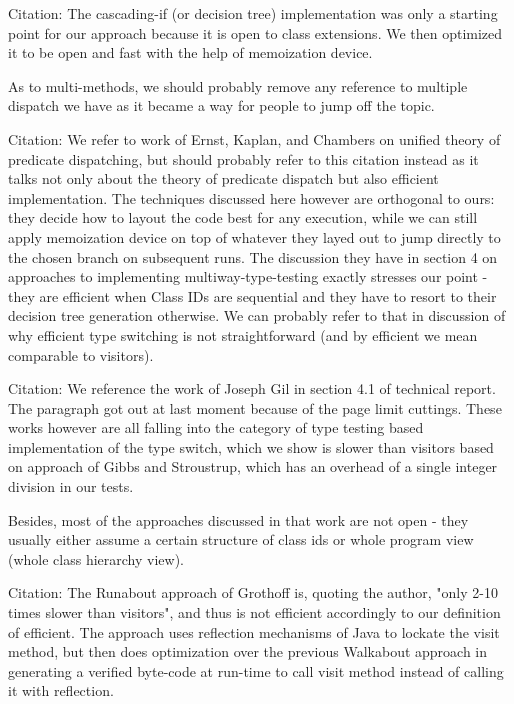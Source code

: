 Citation\cite{Clifton:2000:MMO:353171.353181}:
The cascading-if (or decision tree) implementation was only a starting point for 
our approach because it is open to class extensions. We then optimized it to be 
open and fast with the help of memoization device.  

As to multi-methods, we should probably remove any reference to multiple 
dispatch we have as it became a way for people to jump off the topic. 

Citation\cite{Chambers:1999:EMP:320384.320407}:
We refer to work of Ernst, Kaplan, and Chambers on unified theory of predicate 
dispatching, but should probably refer to this citation instead as it talks not 
only about the theory of predicate dispatch but also efficient implementation. 
The techniques discussed here however are orthogonal to ours: they decide how to 
layout the code best for any execution, while we can still apply memoization 
device on top of whatever they layed out to jump directly to the chosen branch 
on subsequent runs. The discussion they have in section 4 on approaches to 
implementing multiway-type-testing exactly stresses our point - they are 
efficient when Class IDs are sequential and they have to resort to their 
decision tree generation otherwise. We can probably refer to that in discussion 
of why efficient type switching is not straightforward (and by efficient we mean 
comparable to visitors).

Citation\cite{PQEncoding,Zibin:2002:FAC:582419.582434}:
We reference the work of Joseph Gil in section 4.1 of technical report. The 
paragraph got out at last moment because of the page limit cuttings. These works 
however are all falling into the category of type testing based implementation 
of the type switch, which we show is slower than visitors based on approach of 
Gibbs and Stroustrup, which has an overhead of a single integer division in our 
tests. 

Besides, most of the approaches discussed in that work are not open - they 
usually either assume a certain structure of class ids or whole program view 
(whole class hierarchy view).

Citation\cite{runabout}:
The Runabout approach of Grothoff is, quoting the author, "only 2-10 times 
slower than visitors", and thus is not efficient accordingly to our definition 
of efficient. The approach uses reflection mechanisms of Java to lockate the 
visit method, but then does optimization over the previous Walkabout approach in 
generating a verified byte-code at run-time to call visit method instead of 
calling it with reflection.

